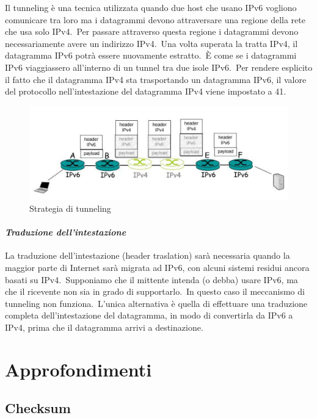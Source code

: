 Il tunneling è una tecnica utilizzata quando due host che usano IPv6 vogliono comunicare tra loro ma i datagrammi devono attraversare una regione della rete che usa solo IPv4.\
Per passare attraverso questa regione i datagrammi devono necessariamente avere un indirizzo IPv4.\
Una volta superata la tratta IPv4, il datagramma IPv6 potrà essere nuovamente estratto.\
È come se i datagrammi IPv6 viaggiassero all'interno di un tunnel tra due isole IPv6.\
Per rendere esplicito il fatto che il datagramma IPv4 sta trasportando un datagramma IPv6, il valore del protocollo nell'intestazione del datagramma IPv4 viene impostato a 41.

\begin{figure}[H]
    \centering
    \includegraphics[width=\textwidth]{immagini/Tunneling.jpg}
    \caption*{Strategia di tunneling}
\end{figure}

\paragraph{\emph{Traduzione dell'intestazione}}

La traduzione dell'intestazione (header traslation) sarà necessaria quando la maggior parte di Internet sarà migrata ad IPv6, con alcuni sistemi residui ancora basati su IPv4.\
Supponiamo che il mittente intenda (o debba) usare IPv6, ma che il ricevente non sia in grado di supportarlo.\
In questo caso il meccanismo di tunneling non funziona.\
L'unica alternativa è quella di effettuare una traduzione completa dell'intestazione del datagramma, in modo di convertirla da IPv6 a IPv4, prima che il datagramma arrivi a destinazione.

\newpage

\section{Approfondimenti}

\subsection{Checksum}

